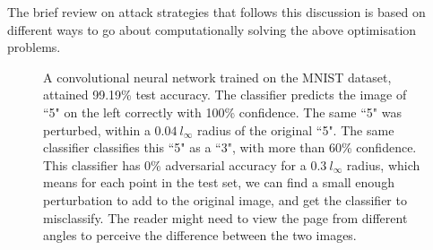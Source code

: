 \documentclass{ociamthesis}
\begin{document}
The brief review on attack strategies that follows this discussion is based on
different ways to go about computationally solving the above optimisation
problems.



\begin{figure}[!h]
    \centering
    \qquad
     \caption{A
    convolutional neural network trained on the MNIST dataset, attained 99.19\%
    test accuracy. The classifier predicts the image of ``5" on the left
    correctly with 100\% confidence. The same ``5" was perturbed, within a
    $0.04~l_\infty$ radius of the original ``5". The same classifier classifies
    this ``5" as a ``3", with more than 60\% confidence. This classifier has 0\%
    adversarial accuracy for a $0.3~l_\infty$ radius, which means for each point
    in the test set, we can find a small enough perturbation to add to the
    original image, and get the classifier to misclassify. The reader might need
    to view the page from different angles to perceive the difference between
    the two images.}
    \label{fig:adversarial-example-5}
\end{figure}
\end{document}
